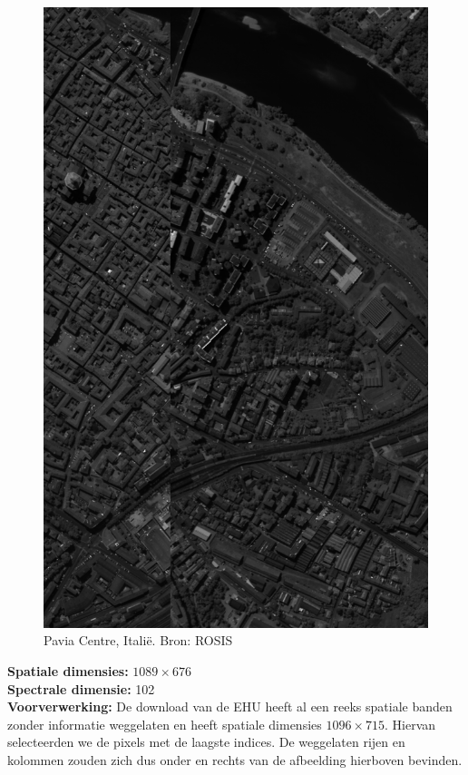 \begin{figure}[H]
  \centering
  \includegraphics[scale=0.4]{images/pavia_sum.png}
  \caption{Pavia Centre, Itali\"e. Bron: ROSIS \cite{ref:ehu_rosis}}
  \label{fig:pavia_sum}
\end{figure}

\textbf{Spatiale dimensies:} $1089 \times 676$\\
\textbf{Spectrale dimensie:} 102\\
\textbf{Voorverwerking:} De download van de EHU \cite{ref:ehu_rosis} heeft al een reeks spatiale banden zonder informatie weggelaten en heeft spatiale dimensies $1096 \times 715$. Hiervan selecteerden we de pixels met de laagste indices. De weggelaten rijen en kolommen zouden zich dus onder en rechts van de afbeelding hierboven bevinden.

